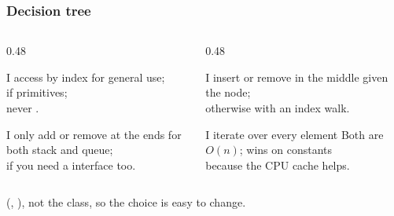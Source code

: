 \documentclass[aspectratio=169,10pt,compress]{beamer}
\begin{document}




\begin{frame}[t,fragile] \frametitle{Decision tree}
  \begin{columns}[T]
    \begin{column}{0.48\textwidth}
      \begin{block}{I access by index}
        \small
         for general use;\\
         if primitives;\\
        never .
      \end{block}
      \begin{block}{I only add or remove at the ends}
        \small
         for both stack and queue;\\
         if you need a  interface too.
      \end{block}
    \end{column}
    \begin{column}{0.48\textwidth}
      \begin{block}{I insert or remove in the middle}
        \small
         given the node;\\
        otherwise  with an index walk.
      \end{block}
      \begin{block}{I iterate over every element}
        \small
        Both are $O(n)$;  wins on constants \\
        because the CPU cache helps.
      \end{block}
    \end{column}
  \end{columns}
  \vspace{0.4em}
  \small
   (, ),
  not the class, so the choice is easy to change.
\end{frame}

\end{document}
